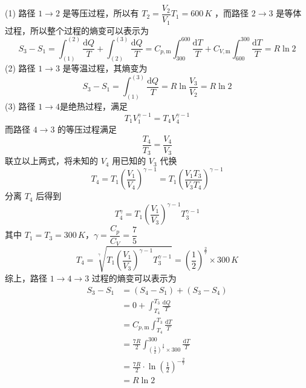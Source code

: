\begin{solution}
    (1) 路径 $1 \to 2$ 是等压过程，所以有 $T_2 = \dfrac{V_2}{V_1}T_1 = 600 \,\si{K}$ ，而路径 $2 \to 3$ 是等体过程，所以整个过程的熵变可以表示为
    $$
        S_3 - S_1
        = \int_{(1)}^{(2)} \frac{\mathrm{d}Q}{T} + \int_{(2)}^{(3)} \frac{\mathrm{d}Q}{T}
        = C_{p,\mathrm{m}}\int_{300}^{600}\frac{\mathrm{d}T}{T} + C_{V,\mathrm{m}}\int_{600}^{300}\frac{\mathrm{d}T}{T}
        = R\ln2
    $$
    (2) 路径 $1 \to 3$ 是等温过程，其熵变为
    $$
        S_3 - S_1 = \int_{(1)}^{(3)} \frac{\mathrm{d}Q}{T} = R\ln\frac{V_3}{V_2} = R\ln2
    $$
    (3) 路径 $1 \to 4$是绝热过程，满足
    $$
        T_1V_1^{\gamma-1} = T_4V_4^{\gamma-1}
    $$
    而路径 $4 \to 3$ 的等压过程满足
    $$
        \frac{T_4}{T_3} = \frac{V_4}{V_3}
    $$
    联立以上两式，将未知的 $V_4$ 用已知的 $V_3$ 代换
    $$
        T_4 = T_1 \left(\frac{V_1}{V_4}\right)^{\gamma-1}
        = T_1 \left(\frac{V_1T_3}{V_3T_4}\right)^{\gamma-1}
    $$
    分离 $T_4$ 后得到
    $$
        T_4^{\gamma} = T_1\left(\frac{V_1}{V_3}\right)^{\gamma-1}T_3^{\gamma-1}
    $$
    其中 $T_1 = T_3 = 300 \,\si{K}$，$\gamma = \dfrac{C_p}{C_V} = \dfrac{7}{5} $
    $$
        T_4
        = \sqrt[\gamma]{T_1\left(\frac{V_1}{V_3}\right)^{\gamma-1}T_3^{\gamma-1}}
        = \left(\frac{1}{2}\right)^{\frac{2}{7}} \times 300 \,\si{K}
    $$
    综上，路径 $1 \to 4 \to 3$ 过程的熵变可以表示为
    $$
        \begin{aligned}
            S_3 - S_1
             & = (S_4 - S_1) + (S_3-S_4)                                                                          \\
             & = 0 + \int_{T_4}^{T_3} \frac{\mathrm{d}Q}{T}                                                       \\
             & = C_{p,\mathrm{m}}\int_{T_4}^{T_3} \frac{\mathrm{d}T}{T}                                           \\
             & = \frac{7R}{2}\int_{\left(\frac{1}{2}\right)^{\frac{2}{7}} \times 300}^{300} \frac{\mathrm{d}T}{T} \\
             & = \frac{7R}{2} \cdot \ln\left(\frac{1}{2}\right)^{-\frac{2}{7}}                                    \\
             & = R \ln2
        \end{aligned}
    $$

\end{solution}

